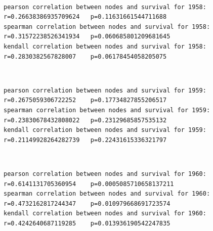 \documentclass[11pt]{article}
\begin{document}
    \begin{center}
    \end{center}
    { \hspace*{\fill} \\}
    
    \begin{Verbatim}[commandchars=\\\{\}]
pearson correlation between nodes and survival for 1958:
r=0.26638386935709624	p=0.11631661544711688
spearman correlation between nodes and survival for 1958:
r=0.31572238526341934	p=0.060685801209681645
kendall correlation between nodes and survival for 1958:
r=0.2830382567828007	p=0.06178454058205075

    \end{Verbatim}

    \begin{center}
    \end{center}
    { \hspace*{\fill} \\}
    
    \begin{Verbatim}[commandchars=\\\{\}]
pearson correlation between nodes and survival for 1959:
r=0.2675059306722252	p=0.17734827855206517
spearman correlation between nodes and survival for 1959:
r=0.23830678432808022	p=0.23129685857535132
kendall correlation between nodes and survival for 1959:
r=0.21149928264282739	p=0.22431615336321797

    \end{Verbatim}

    \begin{center}
    \end{center}
    { \hspace*{\fill} \\}
    
    \begin{Verbatim}[commandchars=\\\{\}]
pearson correlation between nodes and survival for 1960:
r=0.6141131705360954	p=0.0005085710658137211
spearman correlation between nodes and survival for 1960:
r=0.4732162817244347	p=0.010979668691723574
kendall correlation between nodes and survival for 1960:
r=0.4242640687119285	p=0.013936190542247835

    \end{Verbatim}
\end{document}
